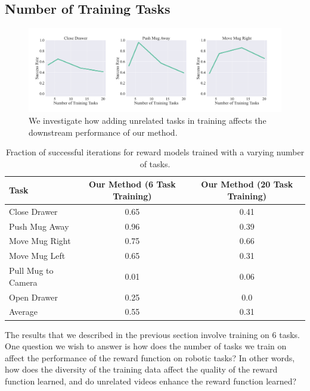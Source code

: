 \subsection{Number of Training Tasks}

\begin{figure}[t]
\vspace{-0.2in}
\begin{center}
    \includegraphics[width=\linewidth]{figs_reward/graph_task_ablation.pdf}
\end{center}
\vspace{-0.1in}
  \caption{\small We investigate how adding unrelated tasks in training affects the downstream performance of our method.}
 \label{fig:graph_task_ablation_reward}
\end{figure}

\begin{table}[t]
    \centering
    \resizebox{\linewidth}{!}
    {%
        \begin{tabular}{lcc}
        \toprule
        Task & Our Method (6 Task Training) & Our Method (20 Task Training) \\
        \midrule
        Close Drawer & 0.65 & 0.41 \\
        Push Mug Away & 0.96 & 0.39 \\
        Move Mug Right & 0.75 & 0.66 \\
        Move Mug Left & 0.65 & 0.31 \\
        Pull Mug to Camera & 0.01 & 0.06 \\
        Open Drawer & 0.25 & 0.0 \\
        \midrule\midrule
        Average & 0.55 & 0.31 \\
        \bottomrule
        \end{tabular}
    }
    \vspace{0.05in}
    \caption{Fraction of successful iterations for reward models trained with a varying number of tasks.}
    \label{table:more_tasks_reward}
\end{table}


The results that we described in the previous section involve training on 6 tasks. One question we wish to answer is how does the number of tasks we train on affect the performance of the reward function on robotic tasks? In other words, how does the diversity of the training data affect the quality of the reward function learned, and do unrelated videos enhance the reward function learned?

